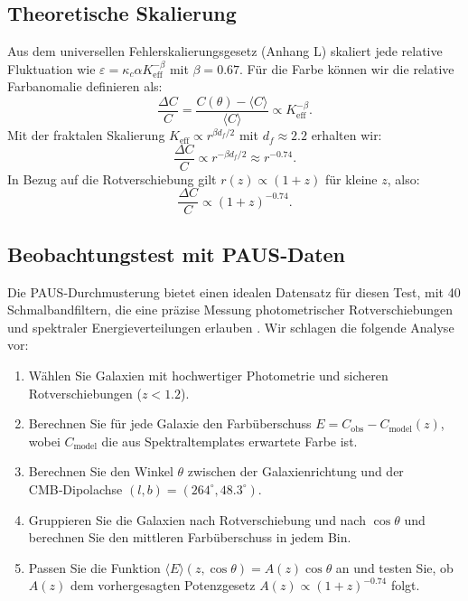 \documentclass[11pt,a4paper]{article}
\newcommand{\Keff}{K_{\mathrm{eff}}}
\begin{document}
	\subsection{Theoretische Skalierung}
	
	Aus dem universellen Fehlerskalierungsgesetz (Anhang L) skaliert jede relative Fluktuation wie \(\varepsilon = \kappa_c \alpha \Keff^{-\beta}\) mit \(\beta = 0.67\). Für die Farbe können wir die relative Farbanomalie definieren als:
	\begin{equation}
		\frac{\Delta C}{C} = \frac{C(\theta) - \langle C \rangle}{\langle C \rangle} \propto \Keff^{-\beta}.
	\end{equation}
	Mit der fraktalen Skalierung \(\Keff \propto r^{\beta d_f/2}\) mit \(d_f \approx 2.2\) erhalten wir:
	\begin{equation}
		\frac{\Delta C}{C} \propto r^{-\beta d_f/2} \approx r^{-0.74}.
	\end{equation}
	In Bezug auf die Rotverschiebung gilt \(r(z) \propto (1+z)\) für kleine \(z\), also:
	\begin{equation}
		\frac{\Delta C}{C} \propto (1+z)^{-0.74}.
	\end{equation}
	
	\subsection{Beobachtungstest mit PAUS‑Daten}
	
	Die PAUS‑Durchmusterung bietet einen idealen Datensatz für diesen Test, mit 40 Schmalbandfiltern, die eine präzise Messung photometrischer Rotverschiebungen und spektraler Energieverteilungen erlauben \cite{Alarcon2019}. Wir schlagen die folgende Analyse vor:
	
	\begin{enumerate}
		\item Wählen Sie Galaxien mit hochwertiger Photometrie und sicheren Rotverschiebungen (\(z < 1.2\)).
		\item Berechnen Sie für jede Galaxie den Farbüberschuss \(E = C_{\mathrm{obs}} - C_{\mathrm{model}}(z)\), wobei \(C_{\mathrm{model}}\) die aus Spektraltemplates erwartete Farbe ist.
		\item Berechnen Sie den Winkel \(\theta\) zwischen der Galaxienrichtung und der CMB‑Dipolachse \((l,b) = (264^\circ, 48.3^\circ)\).
		\item Gruppieren Sie die Galaxien nach Rotverschiebung und nach \(\cos\theta\) und berechnen Sie den mittleren Farbüberschuss in jedem Bin.
		\item Passen Sie die Funktion \(\langle E \rangle(z,\cos\theta) = A(z) \cos\theta\) an und testen Sie, ob \(A(z)\) dem vorhergesagten Potenzgesetz \(A(z) \propto (1+z)^{-0.74}\) folgt.
	\end{enumerate}
	
\end{document}
